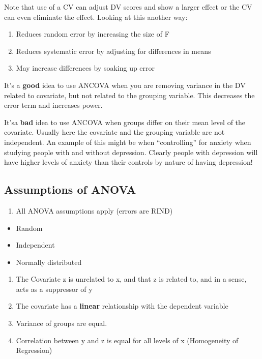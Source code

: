\documentclass[]{book}
\providecommand{\tightlist}{%
  \setlength{\itemsep}{0pt}\setlength{\parskip}{0pt}}
\theoremstyle{definition}
\theoremstyle{definition}
\theoremstyle{definition}
\theoremstyle{remark}
\begin{document}
{Note that use of a CV can adjust DV scores and show a larger effect or
the CV can even eliminate the effect. Looking at this another way:

\begin{enumerate}
\def\labelenumi{\arabic{enumi}.}
\tightlist
\item
  Reduces random error by increasing the size of F
\item
  Reduces systematic error by adjusting for differences in means
\item
  May increase differences by soaking up error
\end{enumerate}

It's a \textbf{good} idea to use ANCOVA when you are removing variance
in the DV related to covariate, but not related to the grouping
variable. This decreases the error term and increases power.

It'sa \textbf{bad} idea to use ANCOVA when groups differ on their mean
level of the covariate. Usually here the covariate and the grouping
variable are not independent. An example of this might be when
``controlling'' for anxiety when studying people with and without
depression. Clearly people with depression will have higher levels of
anxiety than their controls by nature of having depression!

\subsection{Assumptions of ANOVA}\label{assumptions-of-anova}

\begin{enumerate}
\def\labelenumi{\arabic{enumi}.}
\tightlist
\item
  All ANOVA assumptions apply (errors are RIND)
\end{enumerate}

\begin{itemize}
\tightlist
\item
  Random
\item
  Independent
\item
  Normally distributed
\end{itemize}

\begin{enumerate}
\def\labelenumi{\arabic{enumi}.}
\setcounter{enumi}{1}
\tightlist
\item
  The Covariate z is unrelated to x, and that z is related to, and in a
  sense, acts as a suppressor of y
\item
  The covariate has a \textbf{linear} relationship with the dependent
  variable
\item
  Variance of groups are equal.
\item
  Correlation between y and z is equal for all levels of x (Homogeneity
  of Regression)
\end{enumerate}

}
\end{document}
